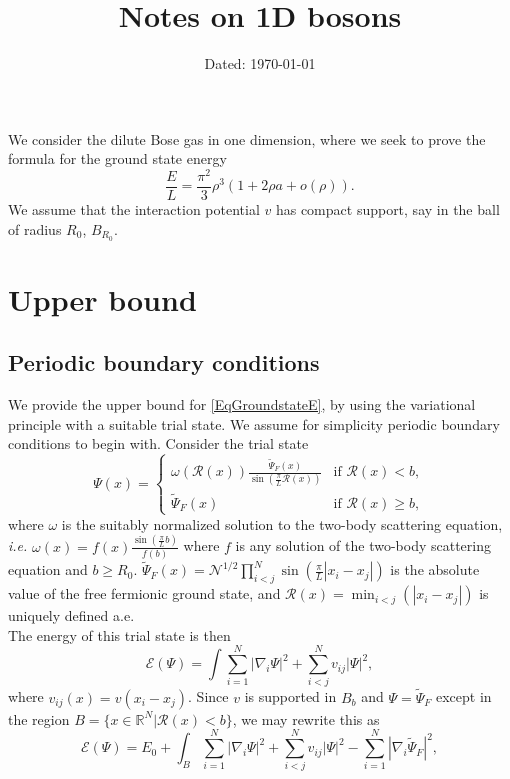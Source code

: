 \documentclass[a4paper,11pt]{article}
\author{}
\date{Dated: \today}
\title{Notes on 1D bosons}
\newcommand{\abs}[1]{\left\lvert #1 \right\rvert}
\newcommand{\ie}{\emph{i.e.} }
\newcommand{\R}{\mathbb{R}}
\newcommand{\rr}{\mathcal{R}}
\numberwithin{equation}{section}
\begin{document}
	\maketitle
	We consider the dilute Bose gas in one dimension, where we seek to prove the formula for the ground state energy \begin{equation}\label{EqGroundstateE}
	\frac{E}{L}=\frac{\pi^2}{3}\rho^3\left(1+2\rho a+ o\left(\rho \right)\right).
	\end{equation} 
	We assume that the interaction potential $ v $ has compact support, say in the ball of radius $ R_0 $, $ B_{R_0} $.
	\section{Upper bound}
	\subsection{Periodic boundary conditions}
	We provide the upper bound for \eqref{EqGroundstateE}, by using the variational principle with a suitable trial state. We assume for simplicity periodic boundary conditions to begin with.
	 Consider the trial state\begin{equation}
	\Psi(x)=\begin{cases}
	\omega(\rr(x))\frac{\tilde{\Psi}_F(x)}{\sin\left(\frac{\pi}{L}\rr(x)\right)}& \text{if }\rr(x)<b,\\
	\tilde{\Psi}_F(x)&\text{if }\rr(x)\geq b,
	\end{cases}
	\end{equation}
	where $ \omega $ is the suitably normalized solution to the two-body scattering equation, \ie $ \omega(x)=f(x)\frac{\sin\left(\frac{\pi}{L}b\right)}{f(b)} $ where $ f $ is any solution of the two-body scattering equation and $ b\geq R_0 $.  $ \tilde{\Psi}_F(x)=\mathcal{N}^{1/2}\prod_{i<j}^{N}\sin\left(\frac{\pi}{L}\abs{x_i-x_j}\right) $ is the absolute value of the free fermionic ground state, and $ \rr(x)=\min_{i<j}(\abs{x_i-x_j}) $ is uniquely defined a.e.\\
	The energy of this trial state is then\begin{equation}
	\mathcal{E}(\Psi)=\int \sum_{i=1}^{N}\abs{\nabla_i\Psi}^2+\sum_{i<j}^{N}v_{ij}\abs{\Psi}^2,
	\end{equation}
	where $ v_{ij}(x)=v(x_i-x_j) $. Since $ v $ is supported in $ B_b $ and $ \Psi=\tilde{\Psi}_F $ except in the region $ B=\{x\in\R^N \vert \rr(x)<b \} $, we may rewrite this as \begin{equation}
	\mathcal{E}(\Psi)=E_0+\int_B \sum_{i=1}^{N}\abs{\nabla_i\Psi}^2+\sum_{i<j}^{N}v_{ij}\abs{\Psi}^2-\sum_{i=1}^{N}\abs{\nabla_i\tilde{\Psi}_F}^2,
	\end{equation}
\end{document}
